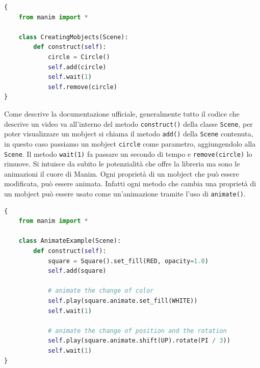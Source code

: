 \documentclass[binding=0.6cm]{sapthesis}
\begin{document}
{\scriptsize %
\begin{lstlisting}[language=Python, caption={un primo esempio di utilizzo di Manim \cite{ManimDocs}}, label={codice:manim_example}]
{
    from manim import *

    class CreatingMobjects(Scene):
        def construct(self):
            circle = Circle()
            self.add(circle)
            self.wait(1)
            self.remove(circle)
}
\end{lstlisting}
}

Come descrive la documentazione ufficiale, generalmente tutto il codice che descrive un video va all'interno del metodo \lstinline|construct()|
della classe \lstinline|Scene|, per poter visualizzare un mobject si chiama il metodo \lstinline|add()| della \lstinline|Scene| contenuta, in questo caso
passiamo un mobject \lstinline|circle| come parametro, aggiungendolo alla \lstinline|Scene|.
Il metodo \lstinline|wait(1)| fa passare un secondo di tempo e \lstinline|remove(circle)| lo rimuove.
Si intuisce da subito le potenzialità che offre la libreria ma sono le animazioni il cuore di Manim.
Ogni proprietà di un mobject che può essere modificata, può essere animata. Infatti ogni metodo che cambia una proprietà di un mobject può essere
usato come un'animazione tramite l'uso di \lstinline|animate()|.

{\scriptsize %
\begin{lstlisting}[language=Python, caption={un primo esempio di animazioni in Manim \cite{ManimDocs}}, label={codice:manim_animation_example}]
{
    from manim import *

    class AnimateExample(Scene):
        def construct(self):
            square = Square().set_fill(RED, opacity=1.0)
            self.add(square)
    
            # animate the change of color
            self.play(square.animate.set_fill(WHITE))
            self.wait(1)
    
            # animate the change of position and the rotation
            self.play(square.animate.shift(UP).rotate(PI / 3))
            self.wait(1)
}
\end{lstlisting}
}
\end{document}
